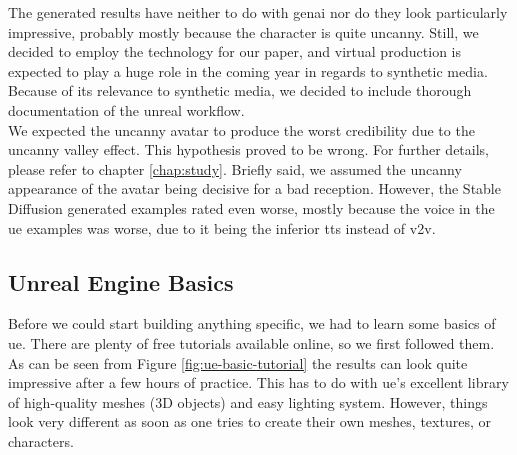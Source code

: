 \documentclass[
  a4paper,  %
  twoside,  %
  bibliography=totoc,
  headsepline,
  cleardoublepage=empty,
  parskip=half,
  draft=false
]{scrbook}
\begin{document}
The generated results have neither to do with \gls{genai} nor do they look particularly impressive, probably mostly because the character is quite uncanny. Still, we decided to employ the technology for our paper, and virtual production is expected to play a huge role in the coming year in regards to synthetic media. Because of its relevance to synthetic media, we decided to include thorough documentation of the unreal workflow. \\
We expected the uncanny avatar to produce the worst credibility due to the uncanny valley effect. This hypothesis proved to be wrong. For further details, please refer to chapter \ref{chap:study}. Briefly said, we assumed the uncanny appearance of the avatar being decisive for a bad reception. However, the Stable Diffusion generated examples rated even worse, mostly because the voice in the \gls{ue} examples was worse, due to it being the inferior \gls{tts} instead of \gls{v2v}.

\subsection*{Unreal Engine Basics}

Before we could start building anything specific, we had to learn some basics of \gls{ue}. There are plenty of free tutorials available online, so we first followed them. As can be seen from Figure \ref{fig:ue-basic-tutorial} the results can look quite impressive after a few hours of practice. This has to do with \gls{ue}'s excellent library of high-quality meshes (3D objects) and easy lighting system. However, things look very different as soon as one tries to create their own meshes, textures, or characters.
\end{document}
